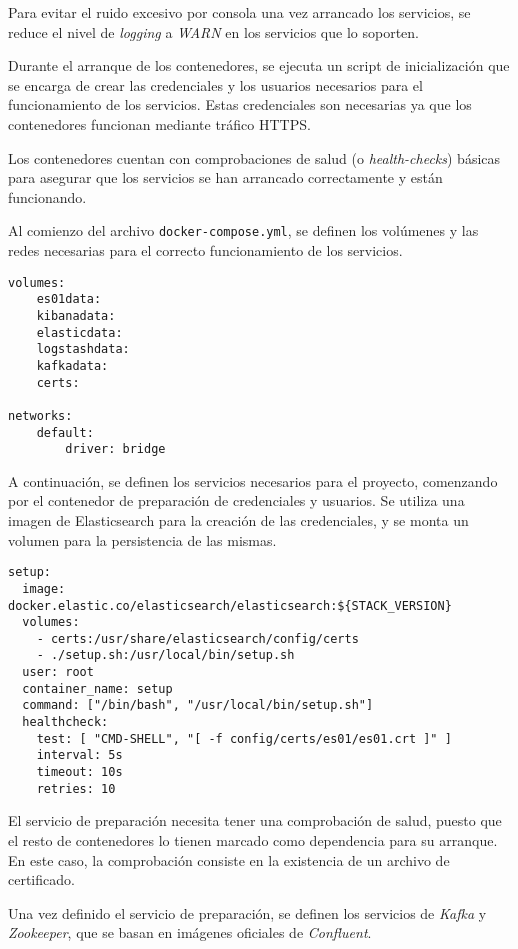 Para evitar el ruido excesivo por consola una vez arrancado los servicios, se
reduce el nivel de \textit{logging} a \textit{WARN} en los servicios que lo
soporten.

Durante el arranque de los contenedores, se ejecuta un script de inicialización
que se encarga de crear las credenciales y los usuarios necesarios para el
funcionamiento de los servicios. Estas credenciales son necesarias ya que los
contenedores funcionan mediante tráfico HTTPS.

Los contenedores cuentan con comprobaciones de salud (o \textit{health-checks})
básicas para asegurar que los servicios se han arrancado correctamente y están
funcionando.

Al comienzo del archivo \texttt{docker-compose.yml}, se definen los volúmenes y
las redes necesarias para el correcto funcionamiento de los servicios.

\begin{lstlisting}[style=yaml, caption={Definición de volúmenes y redes en Docker Compose}]
volumes:
	es01data:
	kibanadata:
	elasticdata:
	logstashdata:
	kafkadata:
	certs:

networks:
	default:
		driver: bridge
\end{lstlisting}

A continuación, se definen los servicios necesarios para el proyecto, comenzando
por el contenedor de preparación de credenciales y usuarios. Se utiliza una
imagen de Elasticsearch para la creación de las credenciales, y se monta un
volumen para la persistencia de las mismas.

\begin{lstlisting}[style=yaml, caption={Definición del servicio de preparación}]
setup:
  image: docker.elastic.co/elasticsearch/elasticsearch:${STACK_VERSION}
  volumes:
    - certs:/usr/share/elasticsearch/config/certs
    - ./setup.sh:/usr/local/bin/setup.sh
  user: root
  container_name: setup
  command: ["/bin/bash", "/usr/local/bin/setup.sh"]
  healthcheck:
    test: [ "CMD-SHELL", "[ -f config/certs/es01/es01.crt ]" ]
    interval: 5s
    timeout: 10s
    retries: 10
\end{lstlisting}

El servicio de preparación necesita tener una comprobación de salud, puesto que
el resto de contenedores lo tienen marcado como dependencia para su arranque. En
este caso, la comprobación consiste en la existencia de un archivo de
certificado.

Una vez definido el servicio de preparación, se definen los servicios de
\textit{Kafka} y \textit{Zookeeper}, que se basan en imágenes oficiales de
\textit{Confluent}.


